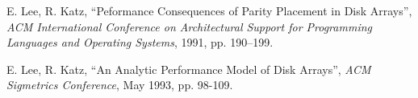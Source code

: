 \begin{thebibliography}{99}



E. Lee, R. Katz,
``Peformance Consequences of Parity Placement in Disk Arrays'',
{\it ACM International Conference on Architectural Support for
Programming Languages and Operating Systems},
1991, pp. 190--199.

E. Lee, R. Katz,
``An Analytic Performance Model of Disk Arrays'',
{\it ACM Sigmetrics Conference},
May 1993, pp. 98-109.









\end{thebibliography}
